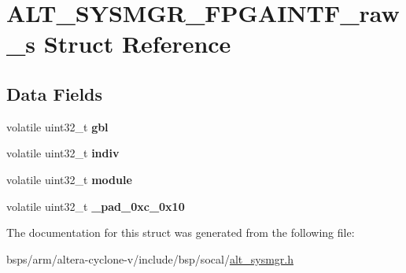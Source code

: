 \hypertarget{structALT__SYSMGR__FPGAINTF__raw__s}{}\section{A\+L\+T\+\_\+\+S\+Y\+S\+M\+G\+R\+\_\+\+F\+P\+G\+A\+I\+N\+T\+F\+\_\+raw\+\_\+s Struct Reference}
\label{structALT__SYSMGR__FPGAINTF__raw__s}
\subsection*{Data Fields}
\begin{DoxyCompactItemize}
\item 
\mbox{\label{structALT__SYSMGR__FPGAINTF__raw__s_a967b0c0abd2e0bbbe550ccc2919303b8}} 
volatile uint32\+\_\+t {\bfseries gbl}
\item 
\mbox{\label{structALT__SYSMGR__FPGAINTF__raw__s_af2415b5e82e8fc46724863d7bff13218}} 
volatile uint32\+\_\+t {\bfseries indiv}
\item 
\mbox{\label{structALT__SYSMGR__FPGAINTF__raw__s_a446059b5289c1919e10dc7d8e036cdcc}} 
volatile uint32\+\_\+t {\bfseries module}
\item 
\mbox{\label{structALT__SYSMGR__FPGAINTF__raw__s_adafce61e4a71424f3c002308e78d48bb}} 
volatile uint32\+\_\+t {\bfseries \+\_\+pad\+\_\+0xc\+\_\+0x10}
\end{DoxyCompactItemize}


The documentation for this struct was generated from the following file\+:\begin{DoxyCompactItemize}
\item 
bsps/arm/altera-\/cyclone-\/v/include/bsp/socal/\mbox{\hyperlink{alt__sysmgr_8h}{alt\+\_\+sysmgr.\+h}}\end{DoxyCompactItemize}
